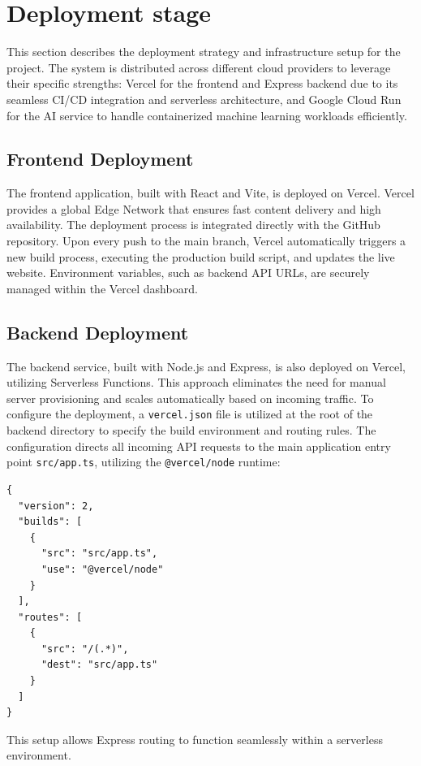 \section{Deployment stage}

This section describes the deployment strategy and infrastructure setup for the project. The system is distributed across different cloud providers to leverage their specific strengths: Vercel for the frontend and Express backend due to its seamless CI/CD integration and serverless architecture, and Google Cloud Run for the AI service to handle containerized machine learning workloads efficiently.

\subsection{Frontend Deployment}
The frontend application, built with React and Vite, is deployed on Vercel. Vercel provides a global Edge Network that ensures fast content delivery and high availability. The deployment process is integrated directly with the GitHub repository. Upon every push to the main branch, Vercel automatically triggers a new build process, executing the production build script, and updates the live website. Environment variables, such as backend API URLs, are securely managed within the Vercel dashboard.

\subsection{Backend Deployment}
The backend service, built with Node.js and Express, is also deployed on Vercel, utilizing Serverless Functions. This approach eliminates the need for manual server provisioning and scales automatically based on incoming traffic.
To configure the deployment, a \texttt{vercel.json} file is utilized at the root of the backend directory to specify the build environment and routing rules. The configuration directs all incoming API requests to the main application entry point \texttt{src/app.ts}, utilizing the \texttt{@vercel/node} runtime:

\begin{verbatim}
{
  "version": 2,
  "builds": [
    {
      "src": "src/app.ts",
      "use": "@vercel/node"
    }
  ],
  "routes": [
    {
      "src": "/(.*)",
      "dest": "src/app.ts"
    }
  ]
}
\end{verbatim}
This setup allows Express routing to function seamlessly within a serverless environment.

